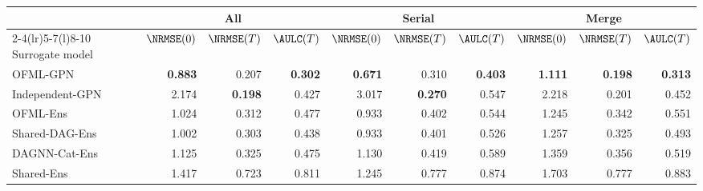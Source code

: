 \begin{tabular}{@{}l rrr rrr rrr@{}}
\toprule
 & \multicolumn{3}{c}{All} & \multicolumn{3}{c}{Serial} & \multicolumn{3}{c}{Merge}\\
\cmidrule(lr){2-4}\cmidrule(lr){5-7}\cmidrule(l){8-10}
Surrogate model & $\NRMSE(0)$ & $\NRMSE(T)$ & $\AULC(T)$ & $\NRMSE(0)$ & $\NRMSE(T)$ & $\AULC(T)$ & $\NRMSE(0)$ & $\NRMSE(T)$ & $\AULC(T)$\\
\midrule
OFML-GPN & \textbf{0.883} & 0.207 & \textbf{0.302} & \textbf{0.671} & 0.310 & \textbf{0.403} & \textbf{1.111} & \textbf{0.198} & \textbf{0.313} \\
Independent-GPN & 2.174 & \textbf{0.198} & 0.427 & 3.017 & \textbf{0.270} & 0.547 & 2.218 & 0.201 & 0.452 \\
OFML-Ens & 1.024 & 0.312 & 0.477 & 0.933 & 0.402 & 0.544 & 1.245 & 0.342 & 0.551 \\
Shared-DAG-Ens & 1.002 & 0.303 & 0.438 & 0.933 & 0.401 & 0.526 & 1.257 & 0.325 & 0.493 \\
DAGNN-Cat-Ens & 1.125 & 0.325 & 0.475 & 1.130 & 0.419 & 0.589 & 1.359 & 0.356 & 0.519 \\
Shared-Ens & 1.417 & 0.723 & 0.811 & 1.245 & 0.777 & 0.874 & 1.703 & 0.777 & 0.883 \\
\bottomrule
\end{tabular}
